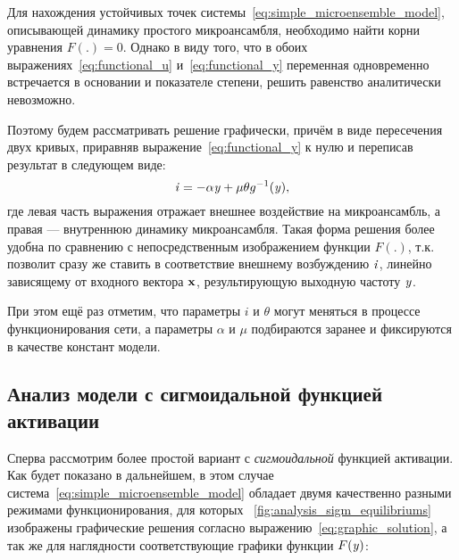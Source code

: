 Для нахождения устойчивых точек системы~\eqref{eq:simple_microensemble_model}, описывающей динамику простого микроансамбля, необходимо найти корни уравнения $F(.) = 0$. Однако в виду того, что в обоих выражениях~\eqref{eq:functional_u} и~\eqref{eq:functional_y} переменная одновременно встречается в основании и показателе степени, решить равенство аналитически невозможно. 

Поэтому будем рассматривать решение графически, причём в виде пересечения двух кривых, приравняв выражение~\eqref{eq:functional_y} к нулю и переписав результат в следующем виде:
\begin{equation}
    \label{eq:graphic_solution}
    \mathit{i} = - \alpha \mathit{y} + \mu \theta g^{-1}(\mathit{y}),
\end{equation}
где левая часть выражения отражает внешнее воздействие на микроансамбль, а правая --- внутреннюю динамику микроансамбля. Такая форма решения более удобна по сравнению с непосредственным изображением функции $F(.)$, т.к. позволит сразу же ставить в соответствие внешнему возбуждению $\mathit{i}$, линейно зависящему от входного вектора $\mathrm{\mathbf{x}}$, результирующую выходную частоту $\mathit{y}$.

При этом ещё раз отметим, что параметры $i$ и $\theta$ могут меняться в процессе функционирования сети, а параметры $\alpha$ и $\mu$ подбираются заранее и фиксируются в качестве констант модели.

\subsection{Анализ модели с сигмоидальной функцией активации}

Сперва рассмотрим более простой вариант с \textit{сигмоидальной} функцией активации. Как будет показано в дальнейшем, в этом случае система~\eqref{eq:simple_microensemble_model} обладает двумя качественно разными режимами функционирования, для которых \onfigure~\ref{fig:analysis_sigm_equilibriums} изображены графические решения согласно выражению~\eqref{eq:graphic_solution}, а так же для наглядности соответствующие графики функции $F(\mathit{y})$:


